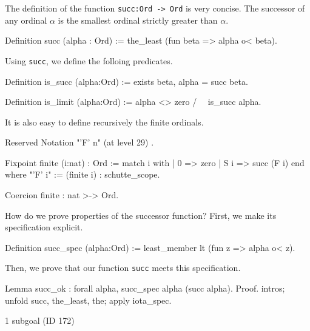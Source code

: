 {The definition of the function \texttt{succ:Ord -> Ord} is very concise. The successor of any ordinal $\alpha$ is the smallest ordinal strictly greater than $\alpha$.

\label{Functions:succ-sch}

\begin{Coqsrc}
Definition succ (alpha : Ord) := the_least (fun beta => alpha o< beta).
\end{Coqsrc}

Using \texttt{succ}, we define the folloing predicates.

\begin{Coqsrc}
Definition is_succ (alpha:Ord) := exists beta, alpha = succ beta.

Definition is_limit (alpha:Ord) := alpha <> zero /\ ~ is_succ alpha.
\end{Coqsrc}

It is also easy to define recursively the finite ordinals.

\label{sect:notation-F-sch}

\begin{Coqsrc}
Reserved Notation "'F' n" (at level 29) .

Fixpoint finite (i:nat) : Ord :=
  match i with 
            | 0 => zero
            | S i => succ (F i)
  end
where "'F' i" := (finite i)  : schutte_scope.

Coercion finite : nat >-> Ord.
\end{Coqsrc}


How do we prove properties of the successor function?
First, we make its specification explicit.

\begin{Coqsrc}
Definition succ_spec (alpha:Ord) :=
  least_member   lt (fun z => alpha o< z).
\end{Coqsrc}

Then, we prove that our function \texttt{succ} meets this specification. 


\begin{Coqsrc}
Lemma succ_ok : forall alpha,  succ_spec alpha  (succ alpha).
Proof.
  intros; unfold succ, the_least, the;  apply iota_spec.
\end{Coqsrc}

\begin{Coqanswer}
1 subgoal (ID 172)
  

\end{Coqanswer}}
